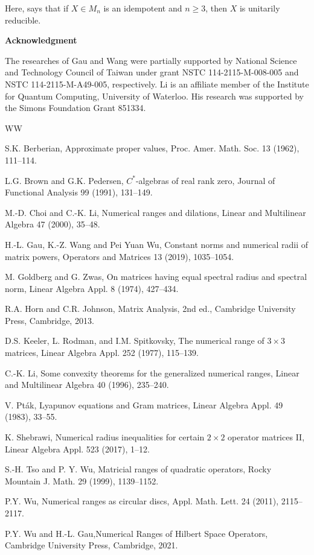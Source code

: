 \documentclass[11pt]{article}
\numberwithin{equation}{section}
\begin{document}
Here, \cite[Lemma 3.1]{GWW} says that if $X\in M_n$ is an idempotent and $n\ge 3$, then $X$ is unitarily reducible.

\medskip\noindent
{\bf \large Acknowledgment}

The researches of  Gau and  Wang were partially supported by National Science and Technology Council of Taiwan under grant NSTC 114-2115-M-008-005 and NSTC 114-2115-M-A49-005, respectively.
Li is an affiliate member of the Institute for Quantum Computing, University
of Waterloo. His research was supported by the Simons Foundation Grant 851334.


\begin{thebibliography}{WW}

S.K. Berberian,
Approximate proper values,  Proc.  Amer.  Math.  Soc.  13 (1962), 111--114.

L.G. Brown and G.K.  Pedersen, $C^*$-algebras of real rank zero,
Journal of Functional Analysis 99 (1991), 131--149.

 M.-D. Choi and C.-K. Li,
Numerical ranges and dilations, Linear and Multilinear Algebra 47 (2000),  35--48.

 H.-L. Gau, K.-Z. Wang and Pei Yuan Wu, Constant norms and numerical radii of matrix powers, Operators and Matrices 13 (2019), 1035--1054.

 M. Goldberg and G. Zwas,
On matrices having equal spectral radius and spectral norm,
Linear Algebra Appl. 8 (1974), 427--434.

 R.A. Horn and C.R. Johnson, Matrix Analysis, 2nd ed., Cambridge University Press, Cambridge, 2013.

 D.S. Keeler, L. Rodman, and I.M. Spitkovsky, The numerical range of $3\times 3$ matrices, Linear Algebra Appl. 252 (1977), 115--139.

C.-K. Li,
Some convexity theorems for the generalized numerical ranges, Linear and Multilinear Algebra 40 (1996), 235--240.

 V. Pt\'{a}k, Lyapunov equations and Gram matrices, Linear Algebra Appl.   49 (1983), 33--55.

 K. Shebrawi,
Numerical radius inequalities for certain $2\times 2$
operator matrices II, Linear Algebra Appl.  523 (2017), 1--12.

 S.-H. Tso and P. Y. Wu, Matricial ranges of quadratic operators, Rocky Mountain J. Math. 29 (1999), 1139--1152.

 P.Y. Wu, Numerical ranges as circular discs, Appl. Math. Lett. 24 (2011), 2115--2117.

 P.Y. Wu and H.-L. Gau,Numerical Ranges of Hilbert Space Operators, Cambridge University Press, Cambridge, 2021.


\end{thebibliography}
\end{document}
